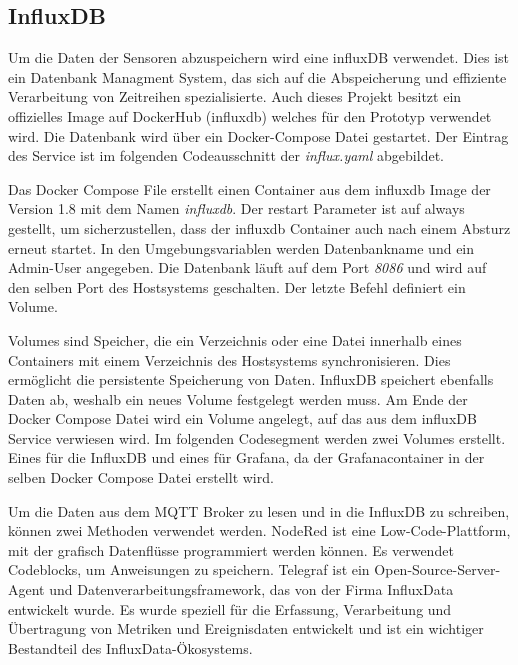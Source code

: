 \documentclass[a4paper, 12pt, oneside, toc=listofnumbered, bibliography=totoc]{scrbook}
\begin{document}
		
		\subsection{InfluxDB}
		
		Um die Daten der Sensoren abzuspeichern wird eine influxDB verwendet. Dies ist ein Datenbank Managment System, das sich auf die Abspeicherung und effiziente Verarbeitung von Zeitreihen spezialisierte. Auch dieses Projekt besitzt ein offizielles Image auf DockerHub (influxdb) welches für den Prototyp verwendet wird. Die Datenbank wird über ein Docker-Compose Datei gestartet. Der Eintrag des Service ist im folgenden Codeausschnitt der \textit{influx.yaml} abgebildet.
		
		
		
		Das Docker Compose File erstellt einen Container aus dem influxdb Image der Version 1.8 mit dem Namen \textit{influxdb}. Der restart Parameter ist auf always gestellt, um sicherzustellen, dass der influxdb Container auch nach einem Absturz erneut startet. In den Umgebungsvariablen werden Datenbankname und ein Admin-User angegeben. Die Datenbank läuft auf dem Port \textit{8086} und wird auf den selben Port des Hostsystems geschalten. Der letzte Befehl definiert ein Volume. 
		
		Volumes sind Speicher, die ein Verzeichnis oder eine Datei innerhalb eines Containers mit einem Verzeichnis des Hostsystems synchronisieren. Dies ermöglicht die persistente Speicherung von Daten. InfluxDB speichert ebenfalls Daten ab, weshalb ein neues Volume festgelegt werden muss. Am Ende der Docker Compose Datei wird ein Volume angelegt, auf das aus dem influxDB Service verwiesen wird. Im folgenden Codesegment werden zwei Volumes erstellt. Eines für die InfluxDB und eines für Grafana, da der Grafanacontainer in der selben Docker Compose Datei erstellt wird.
		
		
		
		Um die Daten aus dem MQTT Broker zu lesen und in die InfluxDB zu schreiben, können zwei Methoden verwendet werden. NodeRed ist eine Low-Code-Plattform, mit der grafisch Datenflüsse programmiert werden können. Es verwendet Codeblocks, um Anweisungen zu speichern. Telegraf ist ein Open-Source-Server-Agent und Datenverarbeitungsframework, das von der Firma InfluxData entwickelt wurde. Es wurde speziell für die Erfassung, Verarbeitung und Übertragung von Metriken und Ereignisdaten entwickelt und ist ein wichtiger Bestandteil des InfluxData-Ökosystems. 
		
\end{document}
